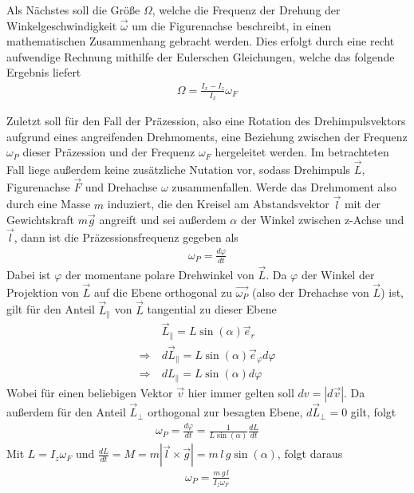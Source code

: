 \documentclass[12pt,a4paper,german]{scrartcl}
\numberwithin{equation}{section}
\begin{document}
  Als Nächstes soll die Größe $\Omega$, welche die Frequenz der Drehung der Winkelgeschwindigkeit $\vec{\omega}$ um die Figurenachse beschreibt, in einen mathematischen Zusammenhang gebracht werden.
  Dies erfolgt durch eine recht aufwendige Rechnung mithilfe der Eulerschen Gleichungen, welche das folgende Ergebnis liefert
  \begin{align}
    \Omega = \frac{I_x - I_z}{I_x} \omega_F
    \label{eq_theo_nutation_Omega_omegaF}
  \end{align}

  Zuletzt soll für den Fall der Präzession, also eine Rotation des Drehimpulsvektors aufgrund eines angreifenden Drehmoments, eine Beziehung zwischen der Frequenz $\omega_P$ dieser Präzession und der Frequenz $\omega_F$ hergeleitet werden.
  Im betrachteten Fall liege außerdem keine zusätzliche Nutation vor, sodass Drehimpuls $\vec{L}$, Figurenachse $\vec{F}$ und Drehachse $\omega$ zusammenfallen.
  Werde das Drehmoment also durch eine Masse $m$ induziert, die den Kreisel am Abstandsvektor $\vec{l}$ mit der Gewichtskraft $m \vec{g}$ angreift und
  sei außerdem $\alpha$ der Winkel zwischen z-Achse und $\vec{l}$, dann ist die Präzessionsfrequenz gegeben als
  \begin{align}
    \omega_P = \frac{d\varphi}{dt}
  \end{align}
  Dabei ist $\varphi$ der momentane polare Drehwinkel von $\vec{L}$.
  Da $\varphi$ der Winkel der Projektion von $\vec{L}$ auf die Ebene orthogonal zu $\vec{\omega_P}$ (also der Drehachse von $\vec{L}$) ist, gilt für den Anteil $\vec{L}_{\parallel}$ von $\vec{L}$ tangential zu dieser Ebene
  \begin{align}
    &\vec{L}_{\parallel} = L \sin(\alpha) \vec{e}_r \nonumber \\
    \Rightarrow \ & d\vec{L}_{\parallel} = L \sin(\alpha) \vec{e}_\varphi d\varphi \nonumber \\
    \Rightarrow \ & dL_{\parallel} = L \sin(\alpha) d\varphi
  \end{align}
  Wobei für einen beliebigen Vektor $\vec{v}$ hier immer gelten soll $dv = |d\vec{v}|$. Da außerdem für den Anteil $\vec{L}_\perp$ orthogonal zur besagten Ebene, $d\vec{L}_\perp = 0$ gilt, folgt
  \begin{align}
    \omega_P = \frac{d\varphi}{dt} = \frac{1}{L \sin(\alpha)} \frac{d L}{dt}
  \end{align}
  Mit $L = I_z \omega_F$ und $\frac{dL}{dt} = M = m | \vec{l} \times \vec{g} | = m \, l \, g \sin(\alpha)$, folgt daraus
  \begin{align}
    \omega_P = \frac{m \, g \, l}{I_z \omega_F}
    \label{eq_theo_precession_omegaP_omegaF}
  \end{align}
\end{document}
